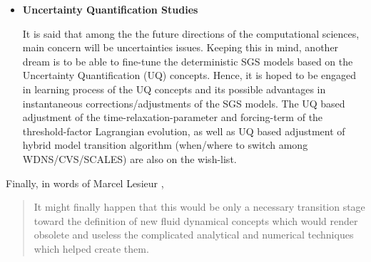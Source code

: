 \begin{itemize}
{  }
  \item \textbf{Uncertainty Quantification Studies} {
  
  It is said that among the the future directions of the computational sciences, main concern will be uncertainties issues.
  Keeping this in mind, another dream is to be able to fine-tune the deterministic SGS models based on the Uncertainty Quantification (UQ) concepts. Hence, it is hoped to be engaged in learning process of the UQ concepts and its possible advantages in instantaneous corrections/adjustments of the SGS models. The UQ based adjustment of the time-relaxation-parameter and forcing-term of the threshold-factor Lagrangian evolution, as well as UQ based adjustment of hybrid model transition algorithm (when/where to switch among WDNS/CVS/SCALES) are also on the wish-list.
  
  
  }
\end{itemize} 

  
  
  
\vspace{50pt}

Finally, in words of Marcel Lesieur \cite{Book_Turbulence_Lesieur},
\begin{quotation}
It might finally happen that this would be only a necessary transition stage toward the definition of new fluid dynamical concepts
which would render obsolete and useless the complicated analytical and numerical techniques which helped create them.
\end{quotation}
